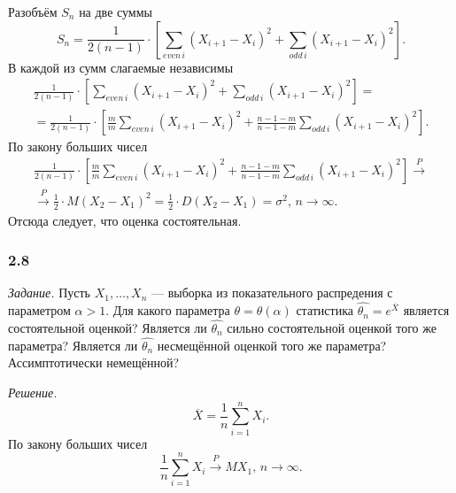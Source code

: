 Разобъём $S_n$ на две суммы
$$S_n =
  \frac{1}{2 \left( n - 1 \right) } \cdot
  \left[
    \sum \limits_{even \, i} \left( X_{i + 1} - X_i \right)^2 +
    \sum \limits_{odd \, i} \left( X_{i + 1} - X_i \right)^2
  \right].$$
В каждой из сумм слагаемые независимы
\begin{equation*}
  \begin{split}
    \frac{1}{2 \left( n - 1 \right) } \cdot
    \left[
      \sum \limits_{even \, i} \left( X_{i + 1} - X_i \right)^2 +
      \sum \limits_{odd \, i} \left( X_{i + 1} - X_i \right)^2
    \right] = \\
    = \frac{1}{2 \left( n - 1 \right) } \cdot
    \left[
      \frac{m}{m} \sum \limits_{even \, i} \left( X_{i + 1} - X_i \right)^2 +
      \frac{n - 1 - m}{n - 1 - m} \sum \limits_{odd \, i} \left( X_{i + 1} - X_i \right)^2
    \right].
  \end{split}
\end{equation*}
По закону больших чисел
\begin{equation*}
  \begin{split}
    \frac{1}{2 \left( n - 1 \right) } \cdot
    \left[
      \frac{m}{m} \sum \limits_{even \, i} \left( X_{i + 1} - X_i \right)^2 +
      \frac{n - 1 - m}{n - 1 - m} \sum \limits_{odd \, i} \left( X_{i + 1} - X_i \right)^2
    \right] \overset{P}{ \rightarrow } \\
    \overset{P}{ \rightarrow } \frac{1}{2} \cdot M \left( X_2 - X_1 \right)^2 =
    \frac{1}{2} \cdot D \left( X_2 - X_1 \right) =
    \sigma^2, \,
    n \to \infty.
  \end{split}
\end{equation*}
Отсюда следует, что оценка состоятельная.

\subsubsection*{2.8}

\textit{Задание.}
Пусть $X_1, \dotsc, X_n$ --- выборка из показательного распредения с параметром $ \alpha > 1$.
Для какого параметра $ \theta = \theta \left( \alpha \right) $ статистика
$ \hat{ \theta_n} = e^{ \overline{X}}$ является состоятельной оценкой?
Является ли $ \hat{ \theta_n}$ сильно состоятельной оценкой того же параметра?
Является ли $ \hat{ \theta_n}$ несмещённой оценкой того же параметра?
Ассимптотически немещённой?

\textit{Решение.}
$$ \overline{X} =
  \frac{1}{n} \sum \limits_{i = 1}^n X_i.$$
По закону больших чисел
$$ \frac{1}{n} \sum \limits_{i = 1}^n X_i \overset{P}{ \to } MX_1, \,
  n \to \infty.$$

